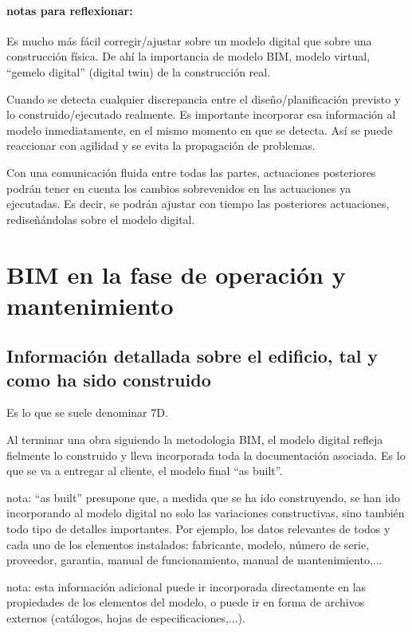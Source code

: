 \documentclass[spanish,12pt,a4paper,final,oneside]{book}
\begin{document}
\subsubsection{notas para reflexionar:}
Es mucho más fácil corregir/ajustar sobre un modelo digital que sobre una construcción física. De ahí la importancia de modelo BIM, modelo virtual, ``gemelo digital'' (digital twin) de la construcción real.

Cuando se detecta cualquier discrepancia entre el diseño/planificación previsto y lo construido/ejecutado realmente. Es importante incorporar esa información al modelo inmediatamente, en el mismo momento en que se detecta. Así se puede reaccionar con agilidad y se evita la propagación de problemas.

Con una comunicación fluida entre todas las partes, actuaciones posteriores podrán tener en cuenta los cambios sobrevenidos en las actuaciones ya ejecutadas. Es decir, se podrán ajustar con tiempo las posteriores actuaciones, rediseñándolas sobre el modelo digital.

\chapter{BIM en la fase de operación y mantenimiento}

\section{Información detallada sobre el edificio, tal y como ha sido construido}
Es lo que se suele denominar 7D.

Al terminar una obra siguiendo la metodologia BIM,  el modelo digital refleja fielmente lo construido y lleva incorporada toda la documentación asociada. Es lo que se va a entregar al cliente, el modelo final ``as built''.

nota: ``as built'' presupone que, a medida que se ha ido construyendo, se han ido incorporando al modelo digital no solo las variaciones constructivas, sino también todo tipo de detalles importantes. Por ejemplo, los datos relevantes de todos y cada uno de los elementos instalados:  fabricante, modelo, número de serie, proveedor, garantia, manual de funcionamiento, manual de mantenimiento,...

nota: esta información adicional puede ir incorporada directamente en las propiedades de los elementos del modelo, o puede ir en forma de archivos externos (catálogos, hojas de especificaciones,...).
\end{document}
